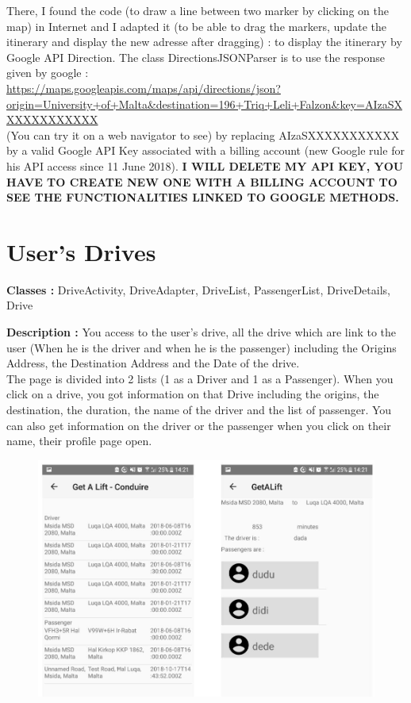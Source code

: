 There, I found the code (to draw a line between two marker by clicking on the map) in Internet and I adapted it (to be able to drag the markers, update the itinerary and display the new adresse after dragging) : to display the itinerary by Google API Direction. \newline
The class DirectionsJSONParser is to use the response given by google : \\
 \url{https://maps.googleapis.com/maps/api/directions/json?origin=University+of+Malta&destination=196+Triq+Leli+Falzon&key=AIzaSXXXXXXXXXXXX} \\
(You can try it on a web navigator to see) by replacing AIzaSXXXXXXXXXXX by a valid Google API Key associated with a billing account (new Google rule for his API access since 11 June 2018). \newline
\textbf{I WILL DELETE MY API KEY, YOU HAVE TO CREATE  NEW ONE WITH A BILLING ACCOUNT TO SEE THE FUNCTIONALITIES LINKED TO GOOGLE METHODS.}


\section{User's Drives}


\textbf{Classes : } DriveActivity, DriveAdapter, DriveList, PassengerList, DriveDetails, Drive \newline

\textbf{Description : } You access to the user’s drive, all the drive which are link to the user (When he is the driver and when he is the passenger) including  the Origins Address, the Destination Address and the Date of the drive. \\ The page is divided into 2 lists (1 as a Driver and 1 as a Passenger). When you click on a drive, you got information on that Drive including the origins, the destination, the duration, the name of the driver and the list of passenger. You can also get information on the driver or the passenger when you click on their name, their profile page open.

\begin{figure}[H]
\begin{center}
\includegraphics[scale = 0.7]{diagrams/Drive_page.JPG} 
\end{center}
\end{figure}


